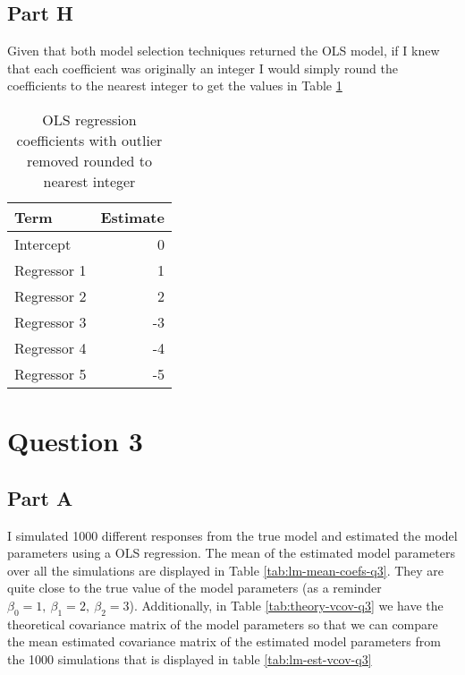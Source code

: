 \documentclass[]{book}
\begin{document}
\hypertarget{part-h}{%
\section{Part H}\label{part-h}}

Given that both model selection techniques returned the OLS model, if I knew that each coefficient was originally an integer I would simply round the coefficients to the nearest integer to get the values in Table \ref{tab:coefs-rounded-q2}

\begin{table}

\caption{\label{tab:coefs-rounded-q2}OLS regression coefficients with outlier removed rounded to nearest integer}
\centering
\begin{tabular}[t]{lr}
\toprule
Term & Estimate\\
\midrule
Intercept & 0\\
Regressor 1 & 1\\
Regressor 2 & 2\\
Regressor 3 & -3\\
Regressor 4 & -4\\
Regressor 5 & -5\\
\bottomrule
\end{tabular}
\end{table}

\hypertarget{question-3}{%
\chapter{Question 3}\label{question-3}}

\hypertarget{part-a-2}{%
\section{Part A}\label{part-a-2}}

I simulated 1000 different responses from the true model and estimated the model parameters using a OLS regression. The mean of the estimated model parameters over all the simulations are displayed in Table \ref{tab:lm-mean-coefs-q3}. They are quite close to the true value of the model parameters (as a reminder \(\beta_0 = 1,\ \beta_1 = 2,\ \beta_2 = 3\)). Additionally, in Table \ref{tab:theory-vcov-q3} we have the theoretical covariance matrix of the model parameters so that we can compare the mean estimated covariance matrix of the estimated model parameters from the 1000 simulations that is displayed in table \ref{tab:lm-est-vcov-q3}
\end{document}
